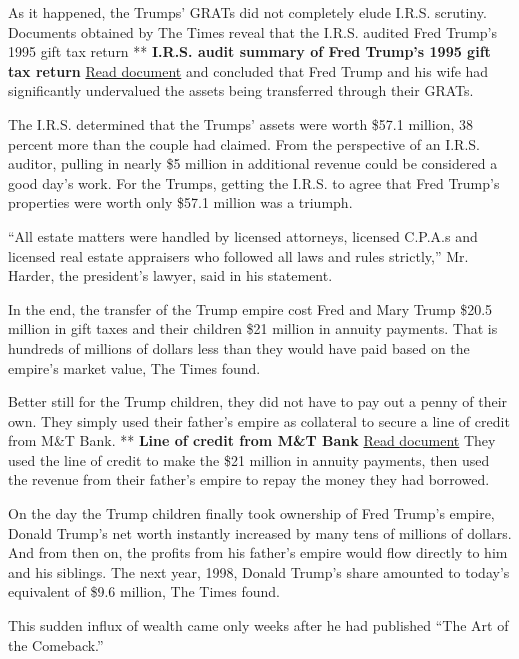 As it happened, the Trumps' GRATs did not completely elude I.R.S.
scrutiny. Documents obtained by The Times reveal that the I.R.S. audited
Fred Trump's 1995 gift tax return ** \textbf{I.R.S. audit summary of
Fred Trump's 1995 gift tax return}
\href{https://int.graylady3jvrrxbe.onion/data/documenthelper/142-fct-1995-federal-gift/9c5e1010469adaac01a2/optimized/full.pdf\#page=1}{Read
document} and concluded that Fred Trump and his wife had significantly
undervalued the assets being transferred through their GRATs.

The I.R.S. determined that the Trumps' assets were worth \$57.1 million,
38 percent more than the couple had claimed. From the perspective of an
I.R.S. auditor, pulling in nearly \$5 million in additional revenue
could be considered a good day's work. For the Trumps, getting the
I.R.S. to agree that Fred Trump's properties were worth only \$57.1
million was a triumph.

``All estate matters were handled by licensed attorneys, licensed
C.P.A.s and licensed real estate appraisers who followed all laws and
rules strictly,'' Mr. Harder, the president's lawyer, said in his
statement.

In the end, the transfer of the Trump empire cost Fred and Mary Trump
\$20.5 million in gift taxes and their children \$21 million in annuity
payments. That is hundreds of millions of dollars less than they would
have paid based on the empire's market value, The Times found.

Better still for the Trump children, they did not have to pay out a
penny of their own. They simply used their father's empire as collateral
to secure a line of credit from M\&T Bank. ** \textbf{Line of credit
from M\&T Bank}
\href{https://int.graylady3jvrrxbe.onion/data/documenthelper/144-djt-1996-ucc/9c5e1010469adaac01a2/optimized/full.pdf\#page=1}{Read
document} They used the line of credit to make the \$21 million in
annuity payments, then used the revenue from their father's empire to
repay the money they had borrowed.

On the day the Trump children finally took ownership of Fred Trump's
empire, Donald Trump's net worth instantly increased by many tens of
millions of dollars. And from then on, the profits from his father's
empire would flow directly to him and his siblings. The next year, 1998,
Donald Trump's share amounted to today's equivalent of \$9.6 million,
The Times found.

This sudden influx of wealth came only weeks after he had published
``The Art of the Comeback.''


